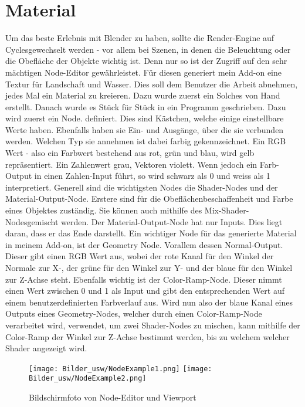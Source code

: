 \documentclass[12pt,twoside]{book}
\begin{document}
\section{Material}
Um das beste Erlebnis mit Blender zu haben, sollte die Render-Engine auf  \glqq Cycles\grqq{ }gewechselt werden - vor allem bei Szenen, in denen die Beleuchtung oder die Obefl\"ache der Objekte wichtig ist.
Denn nur so ist der Zugriff auf den sehr m\"achtigen Node-Editor gew\"ahrleistet. 
F\"ur diesen generiert mein Add-on eine Textur f\"ur Landschaft und Wasser. Dies soll dem Benutzer die Arbeit abnehmen, jedes Mal ein Material zu kreieren.
Dazu wurde zuerst ein Solches von Hand erstellt. Danach wurde es St\"uck f\"ur St\"uck in ein Programm geschrieben. Dazu wird zuerst ein \glqq Node\grqq. definiert. Dies sind K\"astchen, welche einige einstellbare Werte haben. Ebenfalls haben sie Ein- und Ausg\"ange, \"uber die sie verbunden werden. Welchen Typ sie annehmen ist dabei farbig gekennzeichnet. Ein RGB Wert - also ein Farbwert bestehend aus rot, gr\"un und blau, wird gelb repr\"asentiert. Ein Zahlenwert grau, Vektoren violett. Wenn jedoch ein Farb-Output in einen Zahlen-Input f\"uhrt, so wird schwarz als 0 und weiss als 1 interpretiert.
Generell sind die wichtigsten Nodes die Shader-Nodes und der Material-Output-Node. Erstere sind f\"ur die Obefl\"achenbeschaffenheit und Farbe eines Objektes zust\"andig. Sie k\"onnen auch mithilfe des \glqq Mix-Shader-Nodes\grqq{ }gemischt werden. Der Material-Output-Node hat nur Inputs. Dies liegt daran, dass er das Ende darstellt.
Ein wichtiger Node f\"ur das generierte Material in meinem Add-on, ist der Geometry Node. Vorallem dessen \glqq Normal\grqq-Output. Dieser gibt einen RGB Wert aus, wobei der rote Kanal f\"ur den Winkel der Normale zur X-, der gr\"une f\"ur den Winkel zur Y- und der blaue f\"ur den Winkel zur Z-Achse steht.
Ebenfalls wichtig ist der \glqq Color-Ramp-Node\grqq. Dieser nimmt einen Wert zwischen 0 und 1 als Input und gibt den entsprechenden Wert auf einem benutzerdefinierten Farbverlauf aus.
Wird nun also der blaue Kanal eines Outputs eines Geometry-Nodes, welcher durch einen Color-Ramp-Node verarbeitet wird, verwendet, um zwei Shader-Nodes zu mischen, kann mithilfe der Color-Ramp der Winkel zur Z-Achse bestimmt werden, bis zu welchem welcher Shader angezeigt wird.

\begin{figure}[H]
\centering
\texttt{[image: Bilder\_usw/NodeExample1.png]}
\vspace{2cm}
\texttt{[image: Bilder\_usw/NodeExample2.png]}
 \caption{Bildschirmfoto von Node-Editor und Viewport}
  \label{fig:Node}
\centering
\end{figure}
\end{document}
